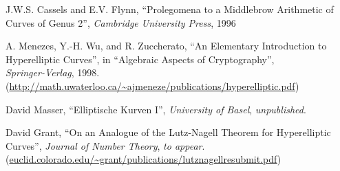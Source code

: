 \documentclass[english,11pt,a4paper]{article}
\begin{document}
\begin{thebibliography}{9}

J.W.S. Cassels and E.V. Flynn, ``Prolegomena to a Middlebrow Arithmetic of Curves of Genus 2'',
\emph{Cambridge University Press},
1996

A. Menezes, Y.-H. Wu, and R. Zuccherato,
``An Elementary Introduction to Hyperelliptic Curves'',
in ``Algebraic Aspects of Cryptography'',\\
\emph{Springer-Verlag},
1998.\\
\small(\url{http://math.uwaterloo.ca/~ajmeneze/publications/hyperelliptic.pdf})
\normalsize

David Masser,
``Elliptische Kurven I'',
\emph{University of Basel},
\emph{unpublished}.

David Grant,
``On an Analogue of the Lutz-Nagell Theorem for \mbox{Hyperelliptic} Curves'',
\emph{Journal of Number Theory},
\emph{to appear}.\\
\small(\url{euclid.colorado.edu/~grant/publications/lutznagellresubmit.pdf})
\normalsize

\end{thebibliography}
\end{document}
